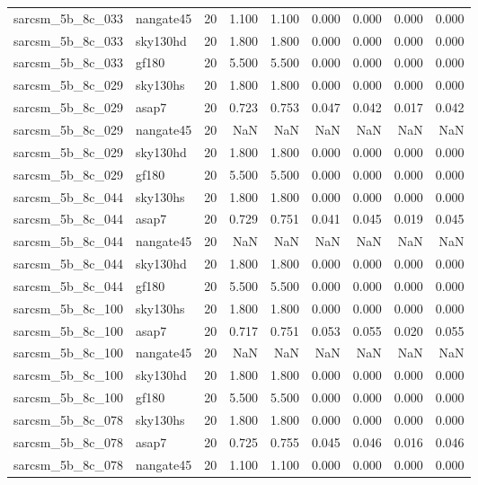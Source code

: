 \begin{tabular}{llrrrrrrr}
sarcsm\_5b\_8c\_033 & nangate45 & 20 & 1.100 & 1.100 & 0.000 & 0.000 & 0.000 & 0.000 \\
sarcsm\_5b\_8c\_033 & sky130hd & 20 & 1.800 & 1.800 & 0.000 & 0.000 & 0.000 & 0.000 \\
sarcsm\_5b\_8c\_033 & gf180 & 20 & 5.500 & 5.500 & 0.000 & 0.000 & 0.000 & 0.000 \\
sarcsm\_5b\_8c\_029 & sky130hs & 20 & 1.800 & 1.800 & 0.000 & 0.000 & 0.000 & 0.000 \\
sarcsm\_5b\_8c\_029 & asap7 & 20 & 0.723 & 0.753 & 0.047 & 0.042 & 0.017 & 0.042 \\
sarcsm\_5b\_8c\_029 & nangate45 & 20 & NaN & NaN & NaN & NaN & NaN & NaN \\
sarcsm\_5b\_8c\_029 & sky130hd & 20 & 1.800 & 1.800 & 0.000 & 0.000 & 0.000 & 0.000 \\
sarcsm\_5b\_8c\_029 & gf180 & 20 & 5.500 & 5.500 & 0.000 & 0.000 & 0.000 & 0.000 \\
sarcsm\_5b\_8c\_044 & sky130hs & 20 & 1.800 & 1.800 & 0.000 & 0.000 & 0.000 & 0.000 \\
sarcsm\_5b\_8c\_044 & asap7 & 20 & 0.729 & 0.751 & 0.041 & 0.045 & 0.019 & 0.045 \\
sarcsm\_5b\_8c\_044 & nangate45 & 20 & NaN & NaN & NaN & NaN & NaN & NaN \\
sarcsm\_5b\_8c\_044 & sky130hd & 20 & 1.800 & 1.800 & 0.000 & 0.000 & 0.000 & 0.000 \\
sarcsm\_5b\_8c\_044 & gf180 & 20 & 5.500 & 5.500 & 0.000 & 0.000 & 0.000 & 0.000 \\
sarcsm\_5b\_8c\_100 & sky130hs & 20 & 1.800 & 1.800 & 0.000 & 0.000 & 0.000 & 0.000 \\
sarcsm\_5b\_8c\_100 & asap7 & 20 & 0.717 & 0.751 & 0.053 & 0.055 & 0.020 & 0.055 \\
sarcsm\_5b\_8c\_100 & nangate45 & 20 & NaN & NaN & NaN & NaN & NaN & NaN \\
sarcsm\_5b\_8c\_100 & sky130hd & 20 & 1.800 & 1.800 & 0.000 & 0.000 & 0.000 & 0.000 \\
sarcsm\_5b\_8c\_100 & gf180 & 20 & 5.500 & 5.500 & 0.000 & 0.000 & 0.000 & 0.000 \\
sarcsm\_5b\_8c\_078 & sky130hs & 20 & 1.800 & 1.800 & 0.000 & 0.000 & 0.000 & 0.000 \\
sarcsm\_5b\_8c\_078 & asap7 & 20 & 0.725 & 0.755 & 0.045 & 0.046 & 0.016 & 0.046 \\
sarcsm\_5b\_8c\_078 & nangate45 & 20 & 1.100 & 1.100 & 0.000 & 0.000 & 0.000 & 0.000 \\

\end{tabular}
